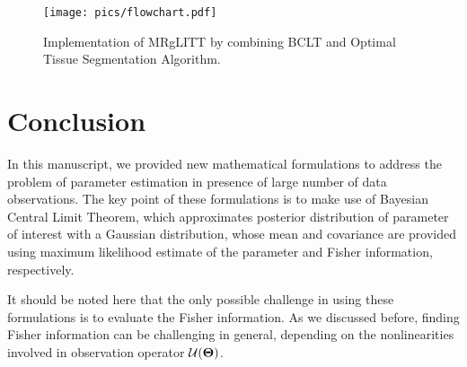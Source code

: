 \documentclass[]{article}
\begin{document}
\begin{figure}[htb!]
\centering
\texttt{[image: pics/flowchart.pdf]}
\caption{Implementation of MRgLITT by combining BCLT and Optimal Tissue Segmentation Algorithm.}\label{treatment}
\end{figure}

\section*{Conclusion}
In this manuscript, we provided new mathematical formulations to address the problem of parameter estimation in presence of large number of data observations. The key point of these formulations is to make use of Bayesian Central Limit Theorem, which approximates posterior distribution of parameter of interest with a Gaussian distribution, whose mean and covariance are provided using maximum likelihood estimate of the parameter and Fisher information, respectively. 

It should be noted here that the only possible challenge in using these formulations is to evaluate the Fisher information. As we discussed before, finding Fisher information can be challenging in general, depending on the nonlinearities involved in observation operator $\mathcal{U}(\boldsymbol{\Theta})$.

%
%
\end{document}
